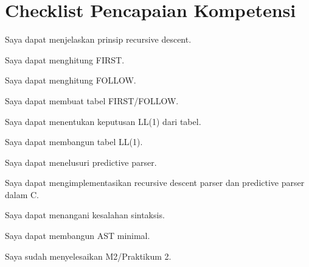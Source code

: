 \section*{Checklist Pencapaian Kompetensi}

\begin{checklist}
  \item Saya dapat menjelaskan prinsip recursive descent.
  \item Saya dapat menghitung FIRST.
  \item Saya dapat menghitung FOLLOW.
  \item Saya dapat membuat tabel FIRST/FOLLOW.
  \item Saya dapat menentukan keputusan LL(1) dari tabel.
  \item Saya dapat membangun tabel LL(1).
  \item Saya dapat menelusuri predictive parser.
  \item Saya dapat mengimplementasikan recursive descent parser dan
        predictive parser dalam C.
  \item Saya dapat menangani kesalahan sintaksis.
  \item Saya dapat membangun AST minimal.
  \item Saya sudah menyelesaikan M2/Praktikum 2.
\end{checklist}

